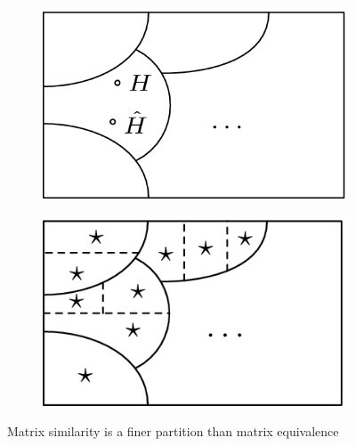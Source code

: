 \documentclass{article}
\begin{document}
        \begin{figure}[H]
            \centering
            \begin{subfigure}{0.45\textwidth}
                \centering
                \includegraphics[scale = .3]{sp23/hw-supplements/hw5-supp/images/linalg_matrix_equivalence_classes.png}
            \end{subfigure}
            \begin{subfigure}{0.45\textwidth}
                \centering
                \includegraphics[scale = .36]{sp23/hw-supplements/hw5-supp/images/linalg_matrix_similarity_equiv_classes.png}
            \end{subfigure}
            \caption{Matrix similarity is a finer partition than matrix equivalence}
            \label{fig:1}
        \end{figure}
\end{document}
